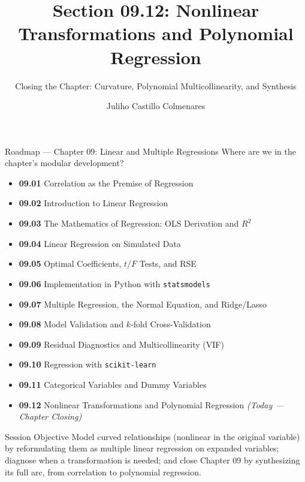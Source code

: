 \documentclass[10pt, aspectratio=169]{beamer}
\title[Nonlinear Transformations]{Section 09.12: Nonlinear Transformations and Polynomial Regression}
\subtitle{Closing the Chapter: Curvature, Polynomial Multicollinearity, and Synthesis}
\author[J. Castillo Colmenares]{Juliho Castillo Colmenares}
\institute{Tecnológico de Monterrey}
\date{\vspace{-1.2cm}}
\begin{document}
\begin{frame}[plain]
  \titlepage
\end{frame}

\begin{frame}{Roadmap --- Chapter 09: Linear and Multiple Regressions}
  \scriptsize
  Where are we in the chapter's modular development?
  \begin{itemize}\itemsep=0.02em
    \item \textbf{09.01} Correlation as the Premise of Regression
    \item \textbf{09.02} Introduction to Linear Regression
    \item \textbf{09.03} The Mathematics of Regression: OLS Derivation and $R^2$
    \item \textbf{09.04} Linear Regression on Simulated Data
    \item \textbf{09.05} Optimal Coefficients, $t$/$F$ Tests, and RSE
    \item \textbf{09.06} Implementation in Python with \texttt{statsmodels}
    \item \textbf{09.07} Multiple Regression, the Normal Equation, and Ridge/Lasso
    \item \textbf{09.08} Model Validation and $k$-fold Cross-Validation
    \item \textbf{09.09} Residual Diagnostics and Multicollinearity (VIF)
    \item \textbf{09.10} Regression with \texttt{scikit-learn}
    \item \textbf{09.11} Categorical Variables and Dummy Variables
    \item \textbf{09.12} Nonlinear Transformations and Polynomial Regression \emph{(Today --- Chapter Closing)}
  \end{itemize}
  \pause
  \vspace{-0.05cm}
  \begin{block}{Session Objective}
    Model curved relationships (nonlinear in the original variable) by reformulating them as multiple linear regression on expanded variables; diagnose when a transformation is needed; and close Chapter 09 by synthesizing its full arc, from correlation to polynomial regression.
  \end{block}
\end{frame}
\end{document}
